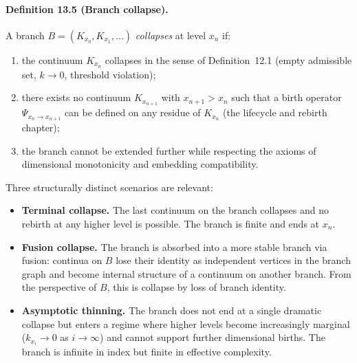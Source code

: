 \paragraph{Definition 13.5 (Branch collapse).}
A branch \(B = (K_{x_0}, K_{x_1}, \dots)\) \emph{collapses} at level
\(x_n\) if:
\begin{enumerate}
  \item the continuum \(K_{x_n}\) collapses in the sense of
        Definition~12.1 (empty admissible set, \(k\to 0\), threshold
        violation);
  \item there exists no continuum \(K_{x_{n+1}}\) with \(x_{n+1}>x_n\)
        such that a birth operator \(\Psi_{x_n\to x_{n+1}}\) can be
        defined on any residue of \(K_{x_n}\) (the lifecycle and rebirth chapter);
  \item the branch cannot be extended further while respecting the axioms
        of dimensional monotonicity and embedding compatibility.
\end{enumerate}

Three structurally distinct scenarios are relevant:

\begin{itemize}
  \item \textbf{Terminal collapse.}\quad
        The last continuum on the branch collapses and no rebirth at any
        higher level is possible. The branch is finite and ends at \(x_n\).
  \item \textbf{Fusion collapse.}\quad
        The branch is absorbed into a more stable branch via fusion:
        continua on \(B\) lose their identity as independent vertices in
        the branch graph and become internal structure of a continuum on
        another branch. From the perspective of \(B\), this is collapse by
        loss of branch identity.
  \item \textbf{Asymptotic thinning.}\quad
        The branch does not end at a single dramatic collapse but enters a
        regime where higher levels become increasingly marginal
        (\(k_{x_i}\to 0\) as \(i\to\infty\)) and cannot support further
        dimensional births. The branch is infinite in index but finite in
        effective complexity.
\end{itemize}

